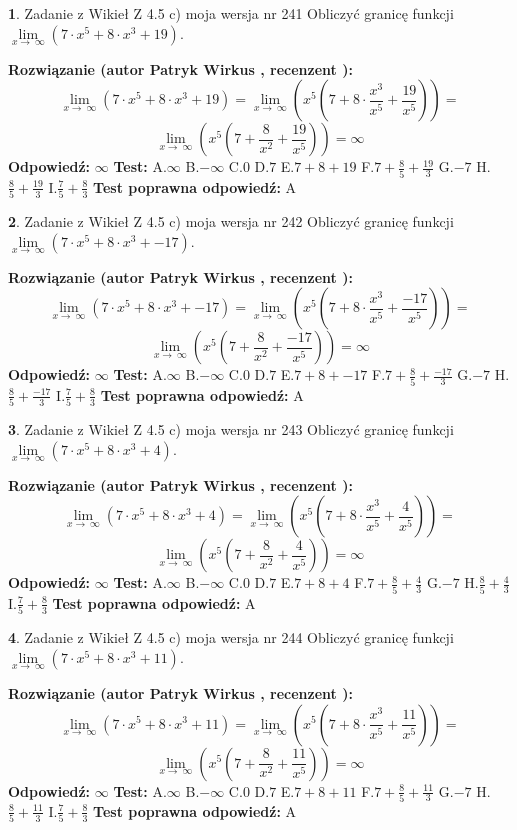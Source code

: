 \documentclass[12pt, a4paper]{article}
\theoremstyle{definition} %
\newtheorem{zad}{}
\newcommand{\zadStart}[1]{\begin{zad}#1\newline}
\newcommand{\zadStop}{\end{zad}}
\newcommand{\rozwStart}[2]{\noindent \textbf{Rozwiązanie (autor #1 , recenzent #2): }\newline}
\newcommand{\rozwStop}{\newline}
\newcommand{\odpStart}{\noindent \textbf{Odpowiedź:}\newline}
\newcommand{\odpStop}{\newline}
\newcommand{\testStart}{\noindent \textbf{Test:}\newline}
\newcommand{\testStop}{\newline}
\newcommand{\kluczStart}{\noindent \textbf{Test poprawna odpowiedź:}\newline}
\newcommand{\kluczStop}{\newline}
\begin{document}
\zadStart{Zadanie z Wikieł Z 4.5 c) moja wersja nr 241}
Obliczyć granicę funkcji  $\lim\limits_{x\to\ \infty}(7 \cdot x^{5}+8 \cdot x^{3}+19)$.
\zadStop
\rozwStart{Patryk Wirkus}{}
$$\lim\limits_{x\to\ \infty}(7 \cdot x^{5}+8 \cdot x^{3}+19) = \lim\limits_{x\to\ \infty}(x^{5}(7 +8 \cdot \frac{x^{3}}{x^{5}}+\frac{19}{x^{5}})) =$$ $$\lim\limits_{x\to\ \infty}(x^{5}(7 +\frac{8}{x^{2}}+\frac{19}{x^{5}})) =\infty$$
\rozwStop
\odpStart
$\infty$
\odpStop
\testStart
A.$\infty$ B.$-\infty$ C.$0$ D.$7$ E.$7 + 8 + 19$
F.$7+\frac{8}{5}+\frac{19}{3}$ G.$-7$
H.$\frac{8}{5}+\frac{19}{3}$
I.$\frac{7}{5}+\frac{8}{3}$
\testStop
\kluczStart
A
\kluczStop



\zadStart{Zadanie z Wikieł Z 4.5 c) moja wersja nr 242}
Obliczyć granicę funkcji  $\lim\limits_{x\to\ \infty}(7 \cdot x^{5}+8 \cdot x^{3}+-17)$.
\zadStop
\rozwStart{Patryk Wirkus}{}
$$\lim\limits_{x\to\ \infty}(7 \cdot x^{5}+8 \cdot x^{3}+-17) = \lim\limits_{x\to\ \infty}(x^{5}(7 +8 \cdot \frac{x^{3}}{x^{5}}+\frac{-17}{x^{5}})) =$$ $$\lim\limits_{x\to\ \infty}(x^{5}(7 +\frac{8}{x^{2}}+\frac{-17}{x^{5}})) =\infty$$
\rozwStop
\odpStart
$\infty$
\odpStop
\testStart
A.$\infty$ B.$-\infty$ C.$0$ D.$7$ E.$7 + 8 + -17$
F.$7+\frac{8}{5}+\frac{-17}{3}$ G.$-7$
H.$\frac{8}{5}+\frac{-17}{3}$
I.$\frac{7}{5}+\frac{8}{3}$
\testStop
\kluczStart
A
\kluczStop



\zadStart{Zadanie z Wikieł Z 4.5 c) moja wersja nr 243}
Obliczyć granicę funkcji  $\lim\limits_{x\to\ \infty}(7 \cdot x^{5}+8 \cdot x^{3}+4)$.
\zadStop
\rozwStart{Patryk Wirkus}{}
$$\lim\limits_{x\to\ \infty}(7 \cdot x^{5}+8 \cdot x^{3}+4) = \lim\limits_{x\to\ \infty}(x^{5}(7 +8 \cdot \frac{x^{3}}{x^{5}}+\frac{4}{x^{5}})) =$$ $$\lim\limits_{x\to\ \infty}(x^{5}(7 +\frac{8}{x^{2}}+\frac{4}{x^{5}})) =\infty$$
\rozwStop
\odpStart
$\infty$
\odpStop
\testStart
A.$\infty$ B.$-\infty$ C.$0$ D.$7$ E.$7 + 8 + 4$
F.$7+\frac{8}{5}+\frac{4}{3}$ G.$-7$
H.$\frac{8}{5}+\frac{4}{3}$
I.$\frac{7}{5}+\frac{8}{3}$
\testStop
\kluczStart
A
\kluczStop



\zadStart{Zadanie z Wikieł Z 4.5 c) moja wersja nr 244}
Obliczyć granicę funkcji  $\lim\limits_{x\to\ \infty}(7 \cdot x^{5}+8 \cdot x^{3}+11)$.
\zadStop
\rozwStart{Patryk Wirkus}{}
$$\lim\limits_{x\to\ \infty}(7 \cdot x^{5}+8 \cdot x^{3}+11) = \lim\limits_{x\to\ \infty}(x^{5}(7 +8 \cdot \frac{x^{3}}{x^{5}}+\frac{11}{x^{5}})) =$$ $$\lim\limits_{x\to\ \infty}(x^{5}(7 +\frac{8}{x^{2}}+\frac{11}{x^{5}})) =\infty$$
\rozwStop
\odpStart
$\infty$
\odpStop
\testStart
A.$\infty$ B.$-\infty$ C.$0$ D.$7$ E.$7 + 8 + 11$
F.$7+\frac{8}{5}+\frac{11}{3}$ G.$-7$
H.$\frac{8}{5}+\frac{11}{3}$
I.$\frac{7}{5}+\frac{8}{3}$
\testStop
\kluczStart
A
\kluczStop
\end{document}
